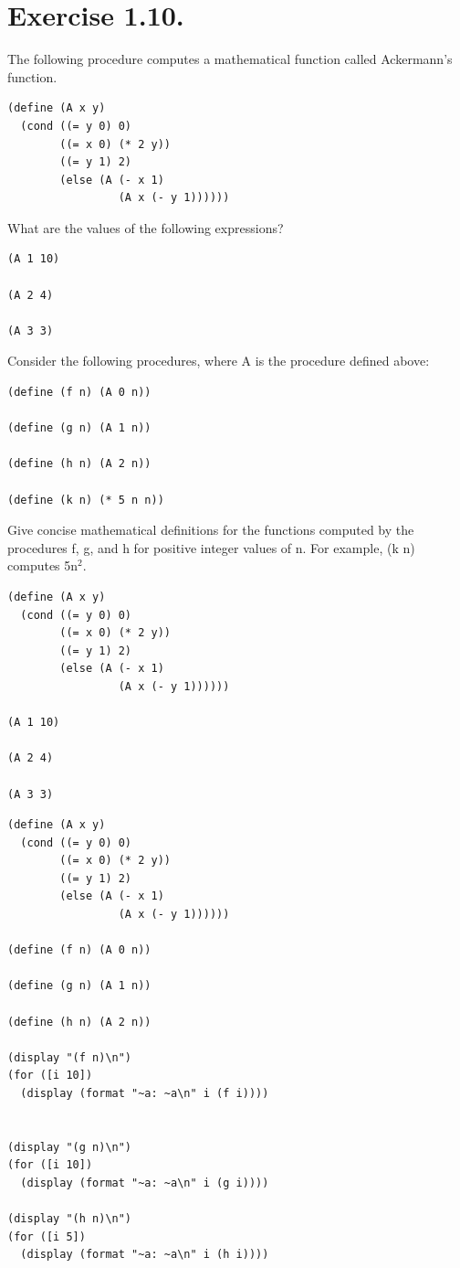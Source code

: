 \documentclass[11pt]{article}
\begin{document}
\section{Exercise 1.10.}
\label{sec-10}


  The following procedure computes a mathematical function called Ackermann's
  function.


\begin{verbatim}
(define (A x y)
  (cond ((= y 0) 0)
        ((= x 0) (* 2 y))
        ((= y 1) 2)
        (else (A (- x 1)
                 (A x (- y 1))))))
\end{verbatim}

What are the values of the following expressions?


\begin{verbatim}
(A 1 10)

(A 2 4)

(A 3 3)
\end{verbatim}

Consider the following procedures, where A is the procedure defined above:


\begin{verbatim}
(define (f n) (A 0 n))

(define (g n) (A 1 n))

(define (h n) (A 2 n))

(define (k n) (* 5 n n))
\end{verbatim}

Give concise mathematical definitions for the functions computed by the
procedures f, g, and h for positive integer values of n. For example, (k n)
computes 5n$^2$.



\begin{verbatim}
(define (A x y)
  (cond ((= y 0) 0)
        ((= x 0) (* 2 y))
        ((= y 1) 2)
        (else (A (- x 1)
                 (A x (- y 1))))))

(A 1 10)

(A 2 4)

(A 3 3)
\end{verbatim}



\begin{verbatim}
(define (A x y)
  (cond ((= y 0) 0)
        ((= x 0) (* 2 y))
        ((= y 1) 2)
        (else (A (- x 1)
                 (A x (- y 1))))))

(define (f n) (A 0 n))

(define (g n) (A 1 n))

(define (h n) (A 2 n))

(display "(f n)\n")
(for ([i 10])
  (display (format "~a: ~a\n" i (f i))))


(display "(g n)\n")
(for ([i 10])
  (display (format "~a: ~a\n" i (g i))))

(display "(h n)\n")
(for ([i 5])
  (display (format "~a: ~a\n" i (h i))))
\end{verbatim}
\end{document}
